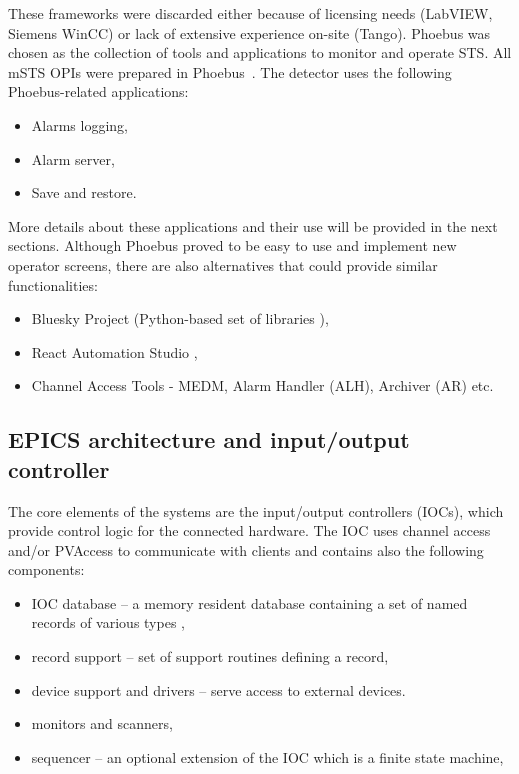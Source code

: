  These frameworks were discarded either because of licensing needs (LabVIEW, Siemens WinCC) or lack of extensive experience on-site (Tango). Phoebus \cite{Phoebus} was chosen as the collection of tools and applications to monitor and operate \gls{STS}. All \gls{mSTS} \glspl{OPI} were prepared in Phoebus~\cite{Phoebus}. The detector uses the following Phoebus-related applications:
\begin{itemize}
    \item Alarms logging,
    \item Alarm server,
    \item Save and restore.
\end{itemize}
More details about these applications and their use will be provided in the next sections. Although Phoebus proved to be easy to use and implement new operator screens, there are also alternatives that could provide similar functionalities:
\begin{itemize}
    \item Bluesky Project (Python-based set of libraries \cite{Bluesky}),
    \item React Automation Studio \cite{React},
    \item Channel Access Tools - MEDM, Alarm Handler (\gls{ALH}), Archiver (\gls{AR}) etc. 
\end{itemize}

\subsection{EPICS architecture and input/output controller}
The core elements of the systems are the input/output controllers (\glspl{IOC}), which provide control logic for the connected hardware. The \gls{IOC} uses channel access and/or PVAccess to communicate with clients and contains also the following components\cite{IOC}:
\begin{itemize}
    \item \gls{IOC} database -- a memory resident database containing a set of named records of various types \cite{IOC2},
    \item record support -- set of support routines defining a record,
    \item device support and drivers -- serve access to external devices.
    \item monitors and scanners,
    \item sequencer -- an optional extension of the \gls{IOC} which is a finite state machine,
\end{itemize}

